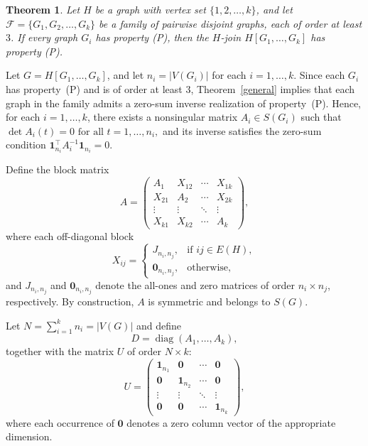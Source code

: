 \documentclass[12pt,reqno]{amsart}
\newtheorem{thm}{Theorem}[section]
\theoremstyle{definition}
\numberwithin{equation}{subsection}
\newenvironment{pf}{\proof}{\endproof}
\numberwithin{equation}{section}
\def\det{\operatorname{det}}
\begin{document}
\begin{thm}\label{thm:H-join}
Let $H$ be a graph with vertex set $\{1,2,\dots,k\}$, and let $\mathcal{F}=\{G_1, G_2, \dots, G_k\}$ be a family of pairwise disjoint graphs, each of order at least $3$. If every graph $G_i$ has property (P), then the $H$-join $H[G_1,\dots,G_k]$ has property (P).
\end{thm}
\begin{pf}
Let $G = H[G_1,\dots,G_k]$, and let $n_i = |V(G_i)|$ for each $i = 1, \dots, k$. Since each $G_i$ has property~(P) and is of order at least $3$,
Theorem~\ref{general} implies that each graph in the family admits a
zero-sum inverse realization of property~(P).
Hence, for each $i=1,\dots,k$, there exists a nonsingular matrix
\(
A_i \in S(G_i)
\)
such that
\(
\det A_i(t)=0 \text{ for all } t=1,\dots,n_i,
\)
and its inverse satisfies the zero-sum condition
\(
\mathbf{1}_{n_i}^\top A_i^{-1}\mathbf{1}_{n_i}=0.
\)

Define the block matrix
\[
A =
\begin{pmatrix}
A_1 & X_{12} & \cdots & X_{1k} \\
X_{21} & A_2 & \cdots & X_{2k} \\
\vdots & \vdots & \ddots & \vdots \\
X_{k1} & X_{k2} & \cdots & A_k
\end{pmatrix},
\]
where each off-diagonal block
\[
X_{ij} =
\begin{cases}
J_{n_i,n_j}, & \text{if } ij \in E(H),\\
\mathbf{0}_{n_i,n_j}, & \text{otherwise},
\end{cases}
\]
and $J_{n_i,n_j}$ and $\mathbf{0}_{n_i,n_j}$ denote the all-ones and zero matrices of order $n_i\times n_j$, respectively. By construction, $A$ is symmetric and belongs to $S(G)$.

Let
\(
N=\sum_{i=1}^k n_i=|V(G)|
\) 
and define
\[
D=\operatorname{diag}(A_1,\dots,A_k),
\]
together with the matrix $U$ of order \(N\times k\):
\[
U=
\begin{pmatrix}
\mathbf{1}_{n_1} & \mathbf{0} & \cdots & \mathbf{0} \\
\mathbf{0} & \mathbf{1}_{n_2} & \cdots & \mathbf{0} \\
\vdots & \vdots & \ddots & \vdots \\
\mathbf{0} & \mathbf{0} & \cdots & \mathbf{1}_{n_k}
\end{pmatrix},
\]
where each occurrence of $\mathbf{0}$ denotes a zero column vector of the appropriate dimension.


\end{pf}
\end{document}
